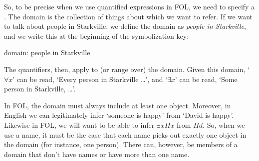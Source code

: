 So, to be precise when we use quantified expressions in FOL, we need to specify a . The domain is the collection of things about which we want to refer. If we want to talk about people in Starkville, we define the domain as \textit{people in Starkville}, and we write this at the beginning of the symbolization key:

\begin{earg}
\item[] domain: people in Starkville
\end{earg}
The quantifiers, then, apply to (or range over) the domain. Given this domain, ‘$\forall x$’ can be read, ‘Every person in Starkville \ldots ’, and ‘$\exists x$’ can be read, ‘Some person in Starkville, \ldots ’.

In FOL, the domain must always include at least one object. Moreover, in English we can legitimately infer ‘someone is happy’ from ‘David is happy’. Likewise in FOL, we will want to be able to infer $\exists xHx$ from $Hd$. So, when we use a name, it must be the case that each name picks out exactly one object in the domain (for instance, one person). There can, however, be members of a domain that don't have names or have more than one name.
